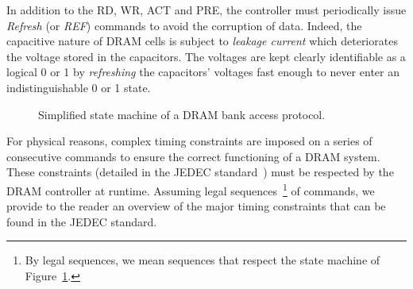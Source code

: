 \documentclass[main.tex]{subfiles}
\begin{document}
In addition to the RD, WR, ACT and PRE, the controller must periodically issue \emph{Refresh} (or \emph{REF}) commands to avoid the corruption of data. Indeed, the capacitive nature of DRAM cells is subject to \emph{leakage current} which deteriorates the voltage stored in the capacitors. The voltages are kept clearly identifiable as a logical 0 or 1 by \emph{refreshing} the capacitors' voltages fast enough to never enter an indistinguishable 0 or 1 state. 

\begin{figure}
    \centering
    \scalebox{0.8}{}
    \caption{Simplified state machine of a DRAM bank access protocol.}
    \label{fig_stateOfTheArt_DRAMstateMachine}
\end{figure}

For physical reasons, complex timing constraints are imposed on a series of consecutive commands to ensure the correct functioning of a DRAM system. These constraints (detailed in the JEDEC standard~\cite{JEDEC2012}) must be respected by the DRAM controller at runtime. Assuming legal sequences~\footnote{By legal sequences, we mean sequences that respect the state machine of Figure~\ref{fig_stateOfTheArt_DRAMstateMachine}.} of commands, we provide to the reader an overview of the major timing constraints that can be found in the JEDEC standard.
\end{document}
